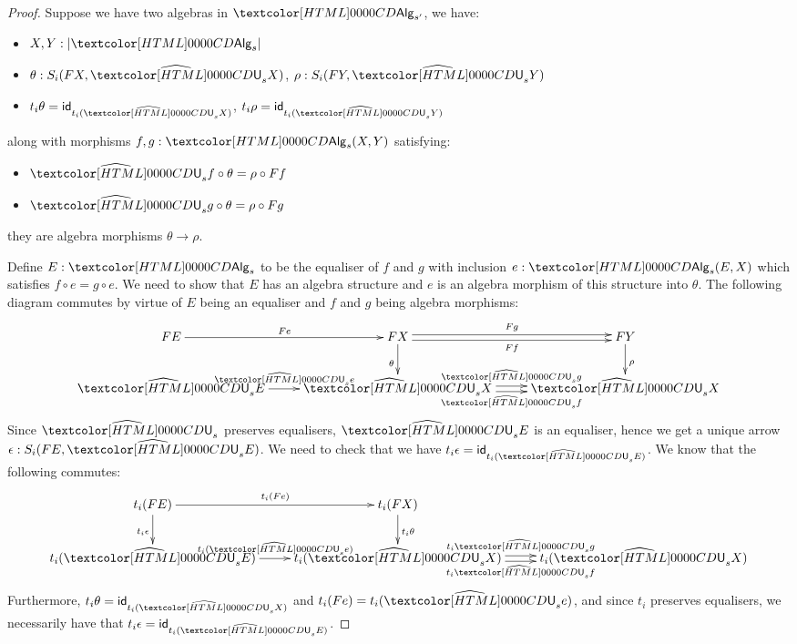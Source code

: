 \begin{proof}
  Suppose we have two algebras in $\Alg_{s'}$, \ie we have:
  \begin{itemize}
  \item $X, Y : | \Alg_s |$
  \item $\theta : S_i(FX,\extendfunc{\Und}_sX)$, $\rho : S_i(FY,\extendfunc{\Und}_sY)$
  \item $t_i \theta = \id_{t_i (\extendfunc{\Und}_s X)}$, $t_i \rho = \id_{t_i (\extendfunc{\Und}_s Y)}$
  \end{itemize}
  along with morphisms $f, g : \Alg_s(X,Y)$ satisfying:
  \begin{itemize}
  \item $\extendfunc{\Und}_s f \circ \theta = \rho \circ Ff$
  \item $\extendfunc{\Und}_s g \circ \theta = \rho \circ Fg$
  \end{itemize}
  \ie they are algebra morphisms $\theta \to \rho$.

  Define $E : \Alg_s$ to be the equaliser of $f$ and $g$ with
  inclusion $e : \Alg_s(E,X)$ which satisfies $f \circ e = g \circ e$.
  We need to show that $E$ has an algebra structure and $e$ is an
  algebra morphism of this structure into $\theta$. The following
  diagram commutes by virtue of $E$ being an equaliser and $f$ and $g$
  being algebra morphisms:
  $$
  \xymatrix{
    FE \ar[r]^{Fe} &FX \ar[d]_{\theta} \ar@<-.5ex>[r]_-{Ff} \ar@<.5ex>[r]^-{Fg} &FY \ar[d]^{\rho} \\
    \extendfunc{\Und}_s E \ar[r]^{\extendfunc{\Und}_s e} &\extendfunc{\Und}_s X \ar@<-.5ex>[r]_-{\extendfunc{\Und}_s f} \ar@<.5ex>[r]^-{\extendfunc{\Und}_s g} &\extendfunc{\Und}_s X
  }
  $$
  Since $\extendfunc{\Und}_s$ preserves equalisers, $\extendfunc{\Und}_s E$ is an equaliser, hence we get a
  unique arrow $\epsilon : S_i(FE,\extendfunc{\Und}_s E)$. We need to check that we have
  $t_i \epsilon = \id_{t_i (\extendfunc{\Und}_s E)}$. We know that the following
  commutes:
  $$
  \xymatrix{
    t_i (FE) \ar[r]^{t_i (Fe)} \ar[d]_{t_i \epsilon} &t_i (FX) \ar[d]^{t_i \theta} \\
    t_i (\extendfunc{\Und}_s E) \ar[r]^{t_i (\extendfunc{\Und}_s e)} &t_i (\extendfunc{\Und}_s X) \ar@<-.5ex>[r]_-{t_i \extendfunc{\Und}_s f} \ar@<.5ex>[r]^-{t_i \extendfunc{\Und}_s g} &t_i (\extendfunc{\Und}_s X)
  }
  $$
  Furthermore, $t_i \theta = \id_{t_i (\extendfunc{\Und}_s X)}$ and
  $t_i (Fe) = t_i (\extendfunc{\Und}_s e)$, and since $t_i$ preserves equalisers, we
  necessarily have that $t_i \epsilon = \id_{t_i (\extendfunc{\Und}_s E)}$.


\end{proof}
